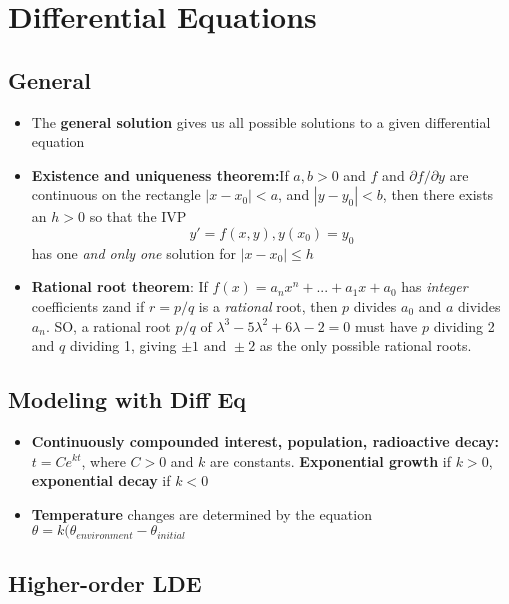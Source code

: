 \documentclass[10pt,letterpaper]{article}
\begin{document}
\section*{Differential Equations}

\subsection*{General}
\begin{itemize}

\item The \textbf{general solution} gives us all possible solutions to a given differential equation

\item \textbf{Existence and uniqueness theorem:}If $a,b>0$ and $f$ and $\partial f/\partial y$ are continuous on the rectangle $|x-x_0|<a$, 
and $|y-y_0|<b$, then there exists an $h>0$ so that the IVP 
$$y'=f(x,y), y(x_0)=y_0$$
has one \textit{and only one} solution for $|x-x_0|\leq h$

\item \textbf{Rational root theorem}: If $f(x)=a_nx^n+...+a_1x+a_0$ has \textit{integer} coefficients zand if $r=p/q$ is a \textit{rational} root, then $p$ divides $a_0$ and $a$ divides $a_n$. SO, a rational root $p/q\mbox{ of }\lambda^3-5\lambda^2+6\lambda-2=0$ must have $p$ dividing 2 and $q$ dividing 1, giving $\pm 1\mbox{ and } \pm 2$ as the only possible rational roots. 

\end{itemize}

\subsection*{Modeling with Diff Eq}

\begin{itemize}
\item \textbf{Continuously compounded interest, population, radioactive decay:} 
$t=Ce^{kt}$, where $C>0$ and $k$ are constants. \textbf{Exponential growth} if $k>0$, \textbf{exponential decay} if $k<0$

\item \textbf{Temperature} changes are determined by the equation 
$\theta = k(\theta_{environment} - \theta_{initial}$

\end{itemize}

\subsection*{Higher-order LDE}
\end{document}
